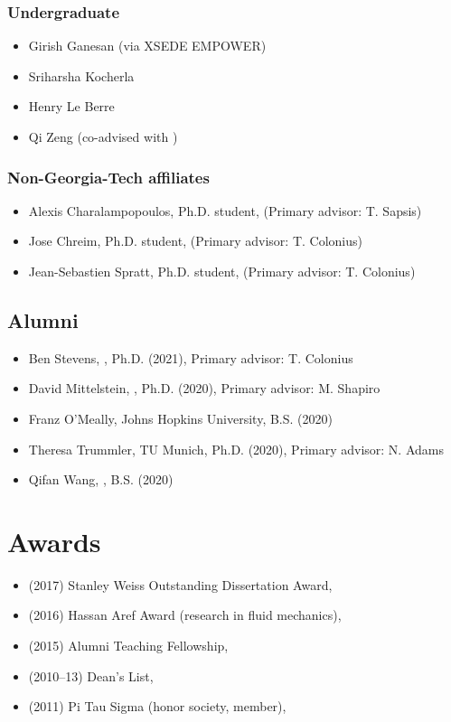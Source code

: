 \subsubsection{Undergraduate}
\begin{itemize}
    \item Girish Ganesan (via XSEDE EMPOWER)
    \item Sriharsha Kocherla
    \item Henry Le Berre
    \item Qi Zeng (co-advised with \Florian)
\end{itemize}

\subsubsection{Non-Georgia-Tech affiliates}
\begin{itemize}
    \item Alexis Charalampopoulos, Ph.D. student, \MIT (Primary advisor: T. Sapsis)
    \item Jose Chreim, Ph.D. student, \CIT (Primary advisor: T. Colonius)
    \item Jean-Sebastien Spratt, Ph.D. student, \CIT (Primary advisor: T. Colonius)
\end{itemize}

\subsection{Alumni}

\begin{itemize}
    \item Ben Stevens, \CIT, Ph.D. (2021), Primary advisor: T. Colonius
    \item David Mittelstein, \CIT, Ph.D. (2020), Primary advisor: M. Shapiro
    \item Franz O'Meally, Johns Hopkins University, B.S. (2020)
    \item Theresa Trummler, TU Munich, Ph.D. (2020), Primary advisor: N. Adams
    \item Qifan Wang, \CIT, B.S. (2020)
\end{itemize}

\section{Awards}

\begin{itemize}
    \item (2017) Stanley Weiss Outstanding Dissertation Award, \UIUC
    \item (2016) Hassan Aref Award (research in fluid mechanics), \UIUC
    \item (2015) Alumni Teaching Fellowship, \UIUC
    \item (2010--13) Dean's List, \UMD
    \item (2011) Pi Tau Sigma (honor society, member), \UMD
\end{itemize}

